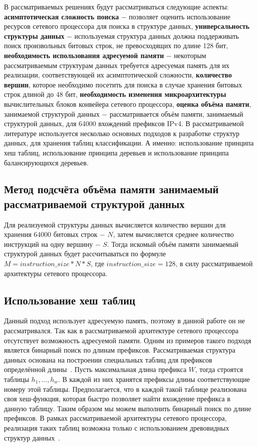 \documentclass[9pt,a4paper]{article}
\begin{document}
        В рассматриваемых решениях будут рассматриваться следующие аспекты:
        {\bf асимптотическая сложность поиска} $-$ позволяет оценить использование 
        ресурсов сетевого процессора для поиска в структуре данных,
        {\bf универсальность структуры данных} $-$ используемая структура данных
        должна поддерживать поиск произвольных битовых строк, не превосходящих по длине 128 бит,
        {\bf необходимость использования адресуемой памяти} $-$ некоторым рассматриваемым 
        структурам данных требуется адресуемая память для их реализации, 
        соответствующей их асимптотической сложности,
        {\bf количество вершин}, которое необходимо посетить для поиска
        в случае хранения битовых строк длиной до 48 бит,
        {\bf необходимость изменения микроархитектуры} вычислительных блоков конвейера 
        сетевого процессора,
        {\bf оценка объёма памяти}, занимаемой структурой данных $-$ рассматривается объём памяти, занимаемый структурой данных, для 64000 вхождений префиксов IPv4.
        В рассматриваемой литературе используется несколько основных подходов к разработке структур данных, 
        для хранения таблиц классификации. А именно: использование принципа хеш таблиц, использование принципа деревьев 
        и использование принципа балансирующихся деревьев.

    \subsection{Метод подсчёта объёма памяти занимаемый рассматриваемой структурой данных}
        Для реализуемой структуры данных вычисляется количество вершин для хранения 64000 битовых строк $-$ $N$, затем вычисляется среднее количество инструкций на 
        одну вершину $-$ $S$. Тогда искомый объём памяти занимаемый структурой данных будет рассчитываться по формуле $M = instruction\_size * N * S$,
        где $instruction\_size = 128$, в силу рассматриваемой архитектуры сетевого процессора.
    \subsection{Использование хеш таблиц}
        Данный подход использует адресуемую память, поэтому в данной работе он не рассматривался. 
        Так как в рассматриваемой архитектуре сетевого процессора отсутствует возможность адресуемой памяти.
        Одним из примеров такого подходя является бинарный поиск по длинам префиксов.
        Рассматриваемая структура данных основана на построении специальных таблиц для префиксов определённой длины~\cite{mun2006binary}. 
        Пусть максимальная длина префикса {\ttfamily $W$}, тогда строятся таблицы {\ttfamily $h_{1},\ldots,h_{w}$}. 
        В каждой из них хранятся префиксы длины соответствующие номеру этой таблицы. 
        Предполагается, что в каждой такой таблице реализована своя хеш-функция, 
        которая быстро позволяет найти вхождение префикса в данную таблицу.
        Таким образом мы можем выполнить бинарный поиск по длине префиксов. 
        В рамках рассматриваемой архитектуры сетевого процессора, 
        реализация таких таблиц возможна только с использованием древовидных структур данных~\cite{mun2006binary}. 
\end{document}
